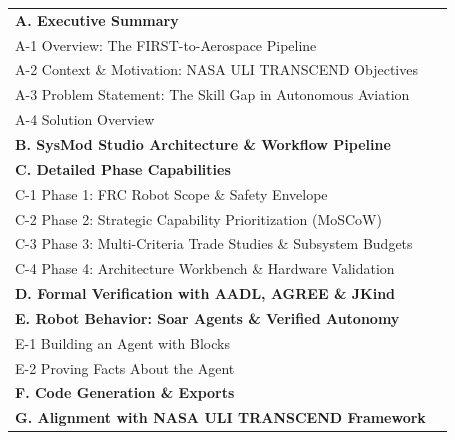 \documentclass[11pt,letterpaper]{article}
\begin{document}
\begin{tabularx}{\linewidth}{X r}
\textbf{A. Executive Summary} & \textbf{\pageref{sec:A}} \\
\hspace{1.5em} A-1 Overview: The FIRST-to-Aerospace Pipeline & \pageref{sec:A1} \\
\hspace{1.5em} A-2 Context \& Motivation: NASA ULI TRANSCEND Objectives & \pageref{sec:A2} \\
\hspace{1.5em} A-3 Problem Statement: The Skill Gap in Autonomous Aviation & \pageref{sec:A3} \\
\hspace{1.5em} A-4 Solution Overview & \pageref{sec:A4} \\
\midrule
\textbf{B. SysMod Studio Architecture \& Workflow Pipeline} & \textbf{\pageref{sec:B}} \\
\midrule
\textbf{C. Detailed Phase Capabilities} & \textbf{\pageref{sec:C}} \\
\hspace{1.5em} C-1 Phase 1: FRC Robot Scope \& Safety Envelope & \pageref{sec:C1} \\
\hspace{1.5em} C-2 Phase 2: Strategic Capability Prioritization (MoSCoW) & \pageref{sec:C2} \\
\hspace{1.5em} C-3 Phase 3: Multi-Criteria Trade Studies \& Subsystem Budgets & \pageref{sec:C3} \\
\hspace{1.5em} C-4 Phase 4: Architecture Workbench \& Hardware Validation & \pageref{sec:C4} \\
\midrule
\textbf{D. Formal Verification with AADL, AGREE \& JKind} & \textbf{\pageref{sec:D}} \\
\midrule
\textbf{E. Robot Behavior: Soar Agents \& Verified Autonomy} & \textbf{\pageref{sec:E}} \\
\hspace{1.5em} E-1 Building an Agent with Blocks & \pageref{sec:E1} \\
\hspace{1.5em} E-2 Proving Facts About the Agent & \pageref{sec:E2} \\
\midrule
\textbf{F. Code Generation \& Exports} & \textbf{\pageref{sec:F}} \\
\midrule
\textbf{G. Alignment with NASA ULI TRANSCEND Framework} & \textbf{\pageref{sec:G}} \\

\end{tabularx}
\end{document}
